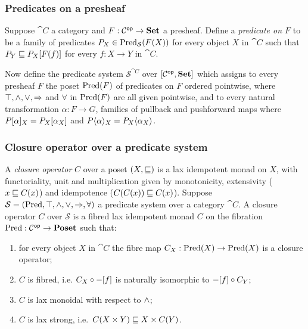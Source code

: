 \subsubsection{Predicates on a presheaf}

Suppose $\cat{C}$ a category and $F: \mathcal{C}^{\mathsf{op}} \to \mathbf{Set}$ a presheaf. Define a \emph{predicate on $F$} to be
a family of predicates $P_X \in \mathrm{Pred}_\mathcal{S}(F(X))$ for every object $X$ in $\cat{C}$ such that $P_Y
\sqsubseteq P_X[F(f)]$ for every $f: X \to Y$ in $\cat{C}$.

Now define the predicate system $\mathcal{S}^{\cat{C}}$ over $[\mathcal{C}^{\mathsf{op}},\mathbf{Set}]$ which assigns to every
presheaf $F$ the poset $\mathrm{Pred}(F)$ of predicates on $F$ ordered pointwise, where $\top, \wedge, \vee,
\Rightarrow$ and $\forall$ in $\mathrm{Pred}(F)$ are all given pointwise, and to every natural transformation $\alpha: F
\to G$, families of pullback and pushforward maps where $P[\alpha]_X = P_X[\alpha_X]$ and
$P\langle\alpha\rangle_X = P_X\langle\alpha_X\rangle$.

\subsubsection{Closure operator over a predicate system}

A \emph{closure operator} $C$ over a poset $(X, \sqsubseteq)$ is a lax idempotent monad on $X$, with functoriality,
unit and multiplication given by monotonicity, extensivity ($x \sqsubseteq C(x)$) and idempotence ($C(C(x)) \sqsubseteq
C(x)$). Suppose $\mathcal{S} = (\mathrm{Pred}, \top, \wedge, \vee, \Rightarrow, \forall)$ a predicate system over a
category $\cat{C}$. A closure operator $C$ over $\mathcal{S}$ is a fibred lax idempotent monad $C$ on the
fibration $\mathrm{Pred}: \mathcal{C}^{\mathsf{op}} \to \mathbf{Poset}$ such that:
\begin{enumerate}
\item for every object $X$ in $\cat{C}$ the fibre map $C_X: \mathrm{Pred}(X) \to \mathrm{Pred}(X)$ is a closure operator;
\item $C$ is fibred, i.e. $C_X \circ -[f]$ is naturally isomorphic to $-[f] \circ C_Y$;
\item $C$ is lax monoidal with respect to $\wedge$;
\item $C$ is lax strong, i.e.~$C(X \times Y) \sqsubseteq X \times C(Y)$.
\end{enumerate}
